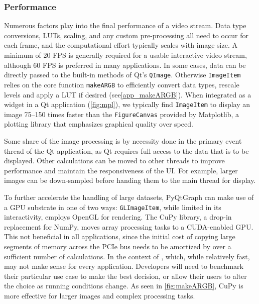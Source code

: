 \documentclass[journal]{vgtc}                %
\begin{document}
\subsubsection{Performance}

Numerous factors play into the final performance of a video stream. Data type conversions, LUTs, scaling, and any custom pre-processing all need to occur for each frame, and the computational effort typically scales with image size. A minimum of 20 FPS is generally required for a usable interactive video stream, although 60 FPS is preferred in many applications. \color{DarkOrchid} In some cases, data can be directly passed to the built-in methods of Qt's \texttt{QImage}. Otherwise \texttt{ImageItem} relies on the core function \texttt{makeARGB} to efficiently convert data types, rescale levels and apply a LUT if desired (see\autoref{app_makeARGB}). When integrated as a widget in a Qt application (\autoref{fig:mpl}), we typically find \texttt{ImageItem} to display an image 75--150 times faster than the \texttt{FigureCanvas} provided by Matplotlib, a plotting library that emphasizes graphical quality over speed.

Some share of the image processing is by necessity done in the primary event thread of the Qt application, as Qt requires full access to the data that is to be displayed. Other calculations can be moved to other threads to improve performance and maintain the responsiveness of the UI. For example, larger images can be down-sampled before handing them to the main thread for display.

\label{sec:cuda}
To further accelerate the handling of large datasets, PyQtGraph can make use of a GPU substrate in one of two ways: \texttt{GLImageItem}, while limited in its interactivity, employs OpenGL for rendering. The CuPy library, a drop-in replacement for NumPy, moves array processing tasks to a CUDA-enabled GPU. This not beneficial in all applications, since the initial cost of copying large segments of memory across the PCIe bus needs to be amortized by over a sufficient number of calculations. In the context of   , which, while relatively fast, may not make sense for every application. Developers will need to benchmark their particular use case to make the best decision, or allow their users to alter the choice as running conditions change. As seen in \autoref{fig:makeARGB}, CuPy is more effective for larger images and complex processing tasks.
\end{document}
